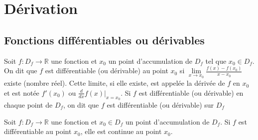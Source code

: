 \section{Dérivation}
	\subsection{Fonctions différentiables ou dérivables}
		\begin{mydef}
			Soit $f:D_f \longrightarrow \mathbb{R}$ une fonction et $x_0$ un point d'accumulation de $D_f$ tel que $x_0\in D_f$. On dit que $f$ est différentiable (ou dérivable) au point $x_0$ si $\lim\limits_{x\to x_0}\frac{f(x)-f(x_0)}{x-x_0}$ existe (nombre réel). Cette limite, si elle existe, est appelée la dérivée de $f$ en $x_0$ et est notée $f'(x_0)$ ou $\frac{d}{dx}f(x)\Big\lvert_{x=x_0}$. Si $f$ est différentiable (ou dérivable) en chaque point de $D_f$, on dit que $f$ est différentiable (ou dérivable) sur $D_f$
		\end{mydef}
		\begin{mythm}
			Soit $f:D_f\longrightarrow\mathbb{R}$ une fonction et $x_0\in D_f$ un point d'accumulation de $D_f$. Si $f$ est différentiable au point $x_0$, elle est continue au point $x_0$.
		\end{mythm}
